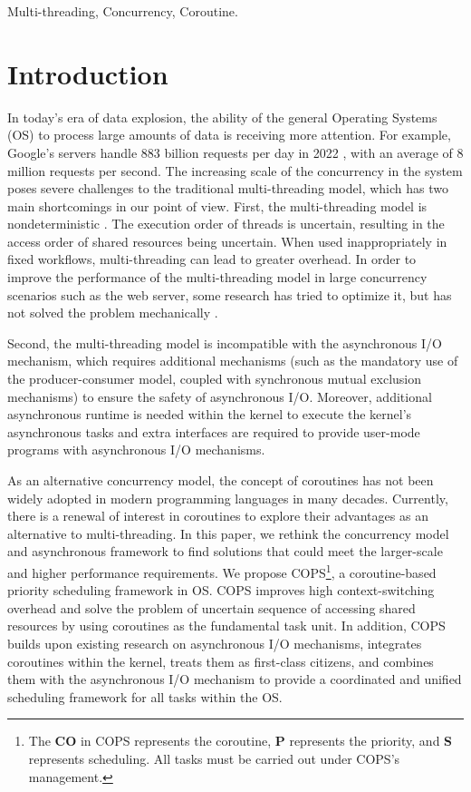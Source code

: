 \documentclass[conference]{IEEEtran}
\begin{document}
\begin{IEEEkeywords}
Multi-threading, Concurrency, Coroutine.
\end{IEEEkeywords}

\section{Introduction}
\label{section: introduction}

In today's era of data explosion, the ability of the general Operating Systems (OS) to process large amounts of data is receiving more attention. For example, Google's servers handle 883 billion requests per day in 2022 \cite{google-search-statistics}, with an average of 8 million requests per second. The increasing scale of the concurrency in the system poses severe challenges to the traditional multi-threading model, which has two main shortcomings in our point of view. First, the multi-threading model is nondeterministic \cite{Lee:EECS-2006-1}. The execution order of threads is uncertain, resulting in the access order of shared resources being uncertain. When used inappropriately in fixed workflows, multi-threading can lead to greater overhead. In order to improve the performance of the multi-threading model in large concurrency scenarios such as the web server, some research has tried to optimize it, but has not solved the problem mechanically \cite{li_combining_2007, howell_cooperative_2002}.

Second, the multi-threading model is incompatible with the asynchronous I/O mechanism, which requires additional mechanisms (such as the mandatory use of the producer-consumer model, coupled with synchronous mutual exclusion mechanisms) to ensure the safety of asynchronous I/O. Moreover, additional asynchronous runtime is needed within the kernel to execute the kernel's asynchronous tasks and extra interfaces are required to provide user-mode programs with asynchronous I/O mechanisms.

As an alternative concurrency model, the concept of coroutines has not been widely adopted in modern programming languages in many decades. Currently, there is a renewal of interest in coroutines to explore their advantages as an alternative to multi-threading. In this paper, we rethink the concurrency model and asynchronous framework to find solutions that could meet the larger-scale and higher performance requirements. We propose COPS\footnote{The \textbf{CO} in COPS represents the coroutine, \textbf{P} represents the priority, and \textbf{S} represents scheduling. All tasks must be carried out under COPS's management.}, a coroutine-based priority scheduling framework in OS. COPS improves high context-switching overhead and solve the problem of uncertain sequence of accessing shared resources by using coroutines as the fundamental task unit. In addition, COPS builds upon existing research on asynchronous I/O mechanisms, integrates coroutines within the kernel, treats them as first-class citizens, and combines them with the asynchronous I/O mechanism to provide a coordinated and unified scheduling framework for all tasks within the OS.
\end{document}
